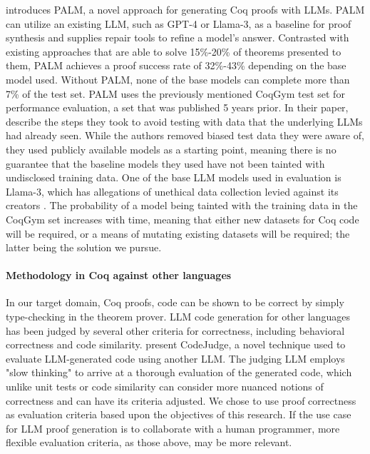 \citep{proofautomationwithllms} introduces PALM,
a novel approach for generating Coq proofs with LLMs.
PALM can utilize an existing LLM, such as GPT-4 or Llama-3,
as a baseline for proof synthesis and supplies repair tools
to refine a model's answer.
Contrasted with existing approaches that are able
to solve 15\%-20\% of theorems presented to them,
PALM achieves a proof success rate of 32\%-43\% 
depending on the base model used.
Without PALM, none of the base models can
complete more than 7\% of the test set.
PALM uses the previously mentioned CoqGym test set
for performance evaluation, 
a set that was published 5 years prior. 
In their paper, \citeauthor{proofautomationwithllms} describe the steps 
they took to avoid testing with data 
that the underlying LLMs had already seen.  
While the authors removed biased test data they were aware of, 
they used publicly available models as a starting point, 
meaning there is no guarantee that the baseline models 
they used have not been tainted with undisclosed training data. 
One of the base LLM models used in evaluation is Llama-3, 
which has allegations of unethical data collection 
levied against its creators \cite{llama-case}. 
The probability of a model being tainted 
with the training data in the CoqGym set increases with time, 
meaning that either new datasets for Coq code will be required, 
or a means of mutating existing datasets will be required; 
the latter being the solution we pursue.



\paragraph{Methodology in Coq against other languages}
In our target domain, Coq proofs,
code can be shown to be correct by simply type-checking in the theorem prover.
LLM code generation for other languages
has been judged by several other criteria for correctness,
including behavioral correctness and code similarity.
\citet{CodeJudge} present CodeJudge, a novel technique
used to evaluate LLM-generated code using another LLM.
The judging LLM employs "slow thinking" to arrive at a
thorough evaluation of the generated code,
which unlike unit tests or code similarity can consider
more nuanced notions of correctness and can have its
criteria adjusted.
We chose to use proof correctness as evaluation criteria
based upon the objectives of this research.
If the use case for LLM proof generation is to
collaborate with a human programmer,
more flexible evaluation criteria, as those above, may be more relevant. 

